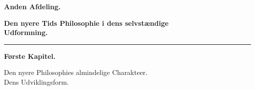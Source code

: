 \documentclass[12pt,a4paper]{book}
\newcommand{\divrule}{\begin{center}\rule{2cm}{0.4pt}\end{center}}
\begin{document}
\begin{center}
  \textbf{\large Anden Afdeling.}
\end{center}

\begin{center}
  \textbf{Den nyere Tids Philosophie i dens selvstændige\\
  Udformning.}
\end{center}

\divrule

\begin{center}
  \textbf{Første Kapitel.}
\end{center}

\begin{center}
  {\large Den nyere Philosophies almindelige Charakteer.\\
  Dens Udviklingsform.}
\end{center}

\end{document}

